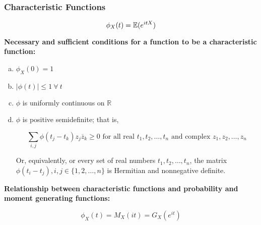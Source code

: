 \subsubsection{Characteristic Functions}

\begin{definition}

\[
\phi_X(t) = \E(e^{itX}) 
\]

\end{definition}

\begin{proposition} \textbf{Necessary and sufficient conditions for a function to be a characteristic function:}

\begin{enumerate}[(a)]

\item \(\phi_X(0) = 1\)

\item \(\left| \phi(t)\right| \leq 1 \ \forall \ t\)

\item \(\phi\) is uniformly continuous on \(\mathbb{R}\)

\item \(\phi\) is positive semidefinite; that is,

\[
\sum_{i, j} \phi(t_j - t_k)z_j \overline{z}_k \geq 0 \text{ for all real } t_1, t_2, \ldots, t_n \text{ and complex } z_1, z_2, \ldots, z_n
\]

Or, equivalently, or every set of real numbers \(t_1, t_2, \ldots, t_n\), the matrix \(\phi(t_i - t_j), i, j \in \{1, 2, \ldots, n\}\) is Hermitian and nonnegative definite.

\end{enumerate}
\end{proposition}

\begin{remark} \textbf{Relationship between characteristic functions and probability and moment generating functions:}

\[
\phi_X(t)  =M_X(it) = G_X(e^{it})
\]

\end{remark}

